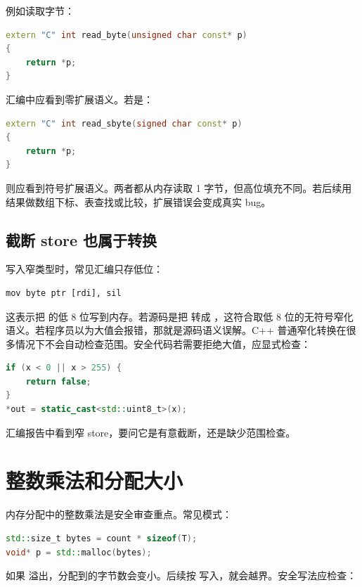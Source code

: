 例如读取字节：

\begin{lstlisting}[language=C++]
extern "C" int read_byte(unsigned char const* p)
{
    return *p;
}
\end{lstlisting}

汇编中应看到零扩展语义。若是：

\begin{lstlisting}[language=C++]
extern "C" int read_sbyte(signed char const* p)
{
    return *p;
}
\end{lstlisting}

则应看到符号扩展语义。两者都从内存读取 1 字节，但高位填充不同。若后续用结果做数组下标、表查找或比较，扩展错误会变成真实 bug。

\subsection{截断 store 也属于转换}

写入窄类型时，常见汇编只存低位：

\begin{lstlisting}
mov byte ptr [rdi], sil
\end{lstlisting}

这表示把  的低 8 位写到内存。若源码是把  转成 ，这符合取低 8 位的无符号窄化语义。若程序员以为大值会报错，那就是源码语义误解。C++ 普通窄化转换在很多情况下不会自动检查范围。安全代码若需要拒绝大值，应显式检查：

\begin{lstlisting}[language=C++]
if (x < 0 || x > 255) {
    return false;
}
*out = static_cast<std::uint8_t>(x);
\end{lstlisting}

汇编报告中看到窄 store，要问它是有意截断，还是缺少范围检查。

\section{整数乘法和分配大小}

内存分配中的整数乘法是安全审查重点。常见模式：

\begin{lstlisting}[language=C++]
std::size_t bytes = count * sizeof(T);
void* p = std::malloc(bytes);
\end{lstlisting}

如果  溢出，分配到的字节数会变小。后续按  写入，就会越界。安全写法应检查：

